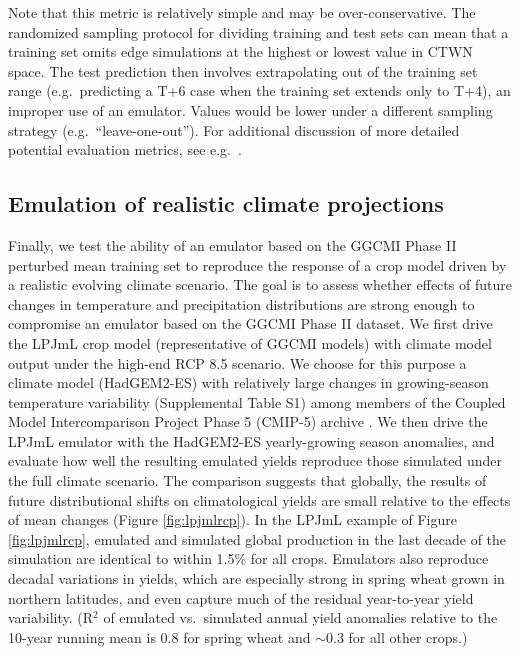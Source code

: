 \documentclass[gmd, manuscript]{copernicus} %
\begin{document}
Note that this metric is relatively simple and may be over-conservative.
The randomized sampling protocol for dividing training and test sets can mean that a training set omits edge simulations at the highest or lowest value in CTWN space. 
The test prediction then involves extrapolating out of the training set range (e.g.\ predicting a T+6 case when the training set extends only to T+4), an improper use of an emulator. 
Values would be lower under a different sampling strategy (e.g.\ ``leave-one-out''). 
For additional discussion of more detailed potential evaluation metrics, see e.g.\ \citet{Castruccio14}.

\smallskip
\label{S:4.3}
\subsection{Emulation of realistic climate projections}
Finally, we test the ability of an emulator based on the GGCMI Phase II perturbed mean training set to reproduce the response of a crop model driven by a realistic evolving climate scenario. The goal is to assess whether effects of future changes in temperature and precipitation distributions  are strong enough to compromise an emulator based on the GGCMI Phase II dataset.
We first drive the LPJmL crop model (representative of GGCMI  models) with climate model output under the high-end RCP 8.5 scenario.
We choose for this purpose a climate model (HadGEM2-ES) with relatively large changes in growing-season temperature variability (Supplemental Table S1) among members of the Coupled Model Intercomparison Project Phase 5 (CMIP-5) archive \citep{Jones2011h, Martin2011}. 
We then drive the LPJmL emulator with the HadGEM2-ES yearly-growing season anomalies, and evaluate how well the resulting emulated yields reproduce those simulated under the full climate scenario. 
The comparison suggests that globally, the results of future distributional shifts on climatological yields are small relative to the effects of mean changes (Figure \ref{fig:lpjmlrcp}). 
In the LPJmL example of Figure \ref{fig:lpjmlrcp}, emulated and simulated global production in the last decade of the simulation are identical to within 1.5\% for all crops.
Emulators also reproduce decadal variations in yields, which are especially strong in spring wheat grown in northern latitudes, and even capture much of the residual year-to-year yield variability. (R$^2$ of emulated vs.\ simulated annual yield anomalies relative to the 10-year running mean is 0.8 for spring wheat and $\sim$0.3 for all other crops.)
\end{document}
